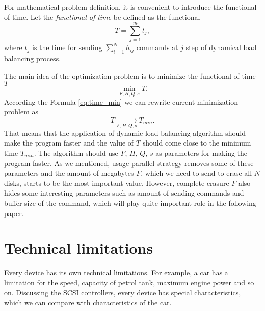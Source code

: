 For mathematical problem definition, it is convenient to introduce the functional of time. Let the \emph{functional of time} be defined as the functional 
\begin{equation}
	T=\sum_{j=1}^{m}t_j,
\end{equation}
where $t_j$ is the time for sending $\sum_{i=1}^{N}h_{ij}$ commands at $j$ step of dynamical load balancing process.

The main idea of the optimization problem is to minimize the functional of time $T$
\begin{equation}
\label{opt_problem}
	\min_{F,H,Q,s}T.
\end{equation}
According the Formula \ref{eq:time_min} we can rewrite current minimization problem as
\begin{equation}
	T \xrightarrow[F,H,Q,s]{} T_{min}.
\end{equation}
That means that the application of dynamic load balancing algorithm should make the program faster and the value of $T$ should come close to the minimum time $T_{min}$. The algorithm should use $F$, $H$, $Q$, $s$ as parameters for making the program faster. As we mentioned, usage parallel strategy removes some of these parameters and the amount of megabytes $F$, which we need to send to erase all $N$ disks, starts to be the most important value. However, complete erasure $F$ also hides some interesting parameters such as amount of sending commands and buffer size of the command, which will play quite important role in the following paper.

\section{Technical limitations}
Every device has its own technical limitations. For example, a car has a limitation for the speed, capacity of petrol tank, maximum engine power and so on. Discussing the SCSI controllers, every device has special characteristics, which we can compare with characteristics of the car.

